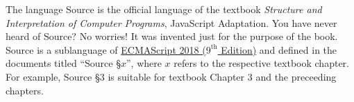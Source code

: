 The language Source is the official language of the textbook \emph{Structure and Interpretation
of Computer Programs}, JavaScript Adaptation.
You have never heard of Source? No worries! It was invented
just for the purpose of the book. Source is a sublanguage of 
\href{http://www.ecma-international.org/publications/files/ECMA-ST/Ecma-262.pdf}{
ECMAScript 2018 ($9^{\textrm{th}}$ Edition)} 
and defined in the documents titled ``Source \S $x$'', where $x$ refers to the
respective textbook chapter. For example, Source \S 3 is suitable for textbook Chapter 3
and the preceeding chapters.
